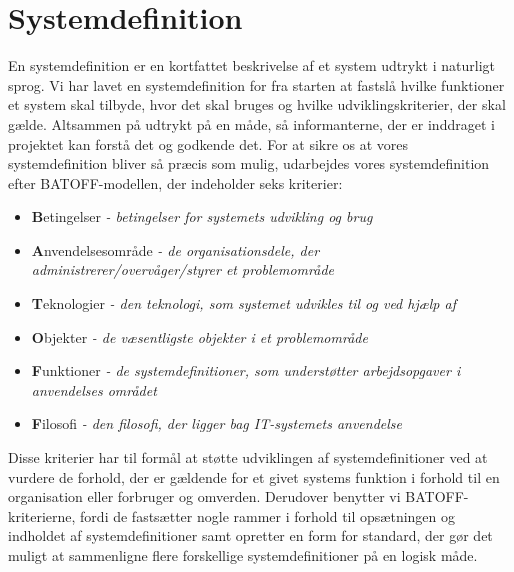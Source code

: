 \section{Systemdefinition}
\label{sec:systemdefinition}

En systemdefinition er en kortfattet beskrivelse af et system udtrykt i naturligt sprog. Vi har lavet en systemdefinition for fra starten at fastslå hvilke funktioner et system skal tilbyde, hvor det skal bruges og hvilke udviklingskriterier, der skal gælde. Altsammen på udtrykt på en måde, så informanterne, der er inddraget i projektet kan forstå det og godkende det. For at sikre os at vores systemdefinition bliver så præcis som mulig, udarbejdes vores systemdefinition efter BATOFF-modellen, der indeholder seks kriterier\cite[s.~37]{ooad}:

\begin{itemize}[noitemsep]
\item \textbf{B}etingelser \textit{- betingelser for systemets udvikling og brug}
\item \textbf{A}nvendelsesområde \textit{- de organisationsdele, der administrerer/overvåger/styrer et problemområde}
\item \textbf{T}eknologier \textit{- den teknologi, som systemet udvikles til og ved hjælp af}
\item \textbf{O}bjekter \textit{- de væsentligste objekter i et problemområde}
\item \textbf{F}unktioner \textit{- de systemdefinitioner, som understøtter arbejdsopgaver i anvendelses området}
\item \textbf{F}ilosofi \textit{- den filosofi, der ligger bag IT-systemets anvendelse}
\end{itemize}

Disse kriterier har til formål at støtte udviklingen af systemdefinitioner ved at vurdere de forhold, der er gældende for et givet systems funktion i forhold til en organisation eller forbruger og omverden. Derudover benytter vi BATOFF-kriterierne, fordi de fastsætter nogle rammer i forhold til opsætningen og indholdet af systemdefinitioner samt opretter en form for standard, der gør det muligt at sammenligne flere forskellige systemdefinitioner på en logisk måde.




